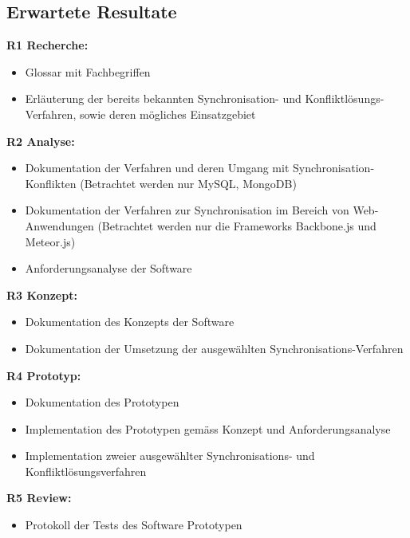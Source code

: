 \documentclass[oneside,11pt,parskip=half,ngerman]{scrreprt}
\begin{document}
\subsection{Erwartete Resultate}\label{erwartete-resultate}

\textbf{R1 Recherche:}

\begin{itemize}
\itemsep1pt\parskip0pt
\item
  Glossar mit Fachbegriffen
\item
  Erläuterung der bereits bekannten Synchronisation- und
  Konfliktlösungs-Verfahren, sowie deren mögliches Einsatzgebiet
\end{itemize}

\textbf{R2 Analyse:}

\begin{itemize}
\itemsep1pt\parskip0pt
\item
  Dokumentation der Verfahren und deren Umgang mit
  Synchronisation-Konflikten (Betrachtet werden nur MySQL, MongoDB)
\item
  Dokumentation der Verfahren zur Synchronisation im Bereich von
  Web-Anwendungen (Betrachtet werden nur die Frameworks Backbone.js und
  Meteor.js)
\item
  Anforderungsanalyse der Software
\end{itemize}

\textbf{R3 Konzept:}

\begin{itemize}
\itemsep1pt\parskip0pt
\item
  Dokumentation des Konzepts der Software
\item
  Dokumentation der Umsetzung der ausgewählten
  Synchronisations-Verfahren
\end{itemize}

\textbf{R4 Prototyp:}

\begin{itemize}
\itemsep1pt\parskip0pt
\item
  Dokumentation des Prototypen
\item
  Implementation des Prototypen gemäss Konzept und Anforderungsanalyse
\item
  Implementation zweier ausgewählter Synchronisations- und
  Konfliktlösungsverfahren
\end{itemize}

\textbf{R5 Review:}

\begin{itemize}
\itemsep1pt\parskip0pt
\item
  Protokoll der Tests des Software Prototypen
\end{itemize}
\end{document}
